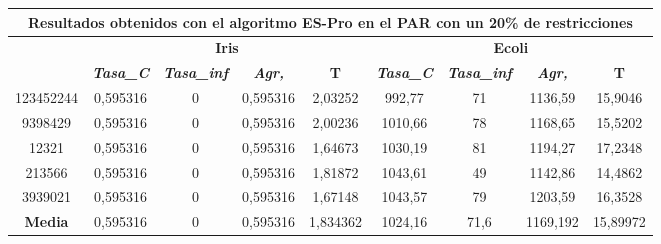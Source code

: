 \documentclass[12pt, spanish]{article}
\begin{document}
\begin{table}[H]
\begin{tabular}{|c|c|c|c|c|c|c|c|c|}
\hline
\multicolumn{9}{|c|}{\textbf{Resultados obtenidos con el algoritmo ES-Pro en el PAR con un 20\% de restricciones}}                                                                                                \\ \hline
\multirow{2}{*}{} & \multicolumn{4}{c|}{\textbf{Iris}}                                                            & \multicolumn{4}{c|}{\textbf{Ecoli}}                                                           \\ \cline{2-9} 
                  & \textit{\textbf{Tasa\_C}} & \textit{\textbf{Tasa\_inf}} & \textit{\textbf{Agr,}} & \textbf{T} & \textit{\textbf{Tasa\_C}} & \textit{\textbf{Tasa\_inf}} & \textit{\textbf{Agr,}} & \textbf{T} \\ \hline
123452244         & 0,595316                  & 0                           & 0,595316               & 2,03252    & 992,77                    & 71                          & 1136,59                & 15,9046    \\ \hline
9398429           & 0,595316                  & 0                           & 0,595316               & 2,00236    & 1010,66                   & 78                          & 1168,65                & 15,5202    \\ \hline
12321             & 0,595316                  & 0                           & 0,595316               & 1,64673    & 1030,19                   & 81                          & 1194,27                & 17,2348    \\ \hline
213566            & 0,595316                  & 0                           & 0,595316               & 1,81872    & 1043,61                   & 49                          & 1142,86                & 14,4862    \\ \hline
3939021           & 0,595316                  & 0                           & 0,595316               & 1,67148    & 1043,57                   & 79                          & 1203,59                & 16,3528    \\ \hline
\textbf{Media}    & 0,595316                  & 0                           & 0,595316               & 1,834362   & 1024,16                   & 71,6                        & 1169,192               & 15,89972   \\ \hline
\end{tabular}
\end{table}
\end{document}
